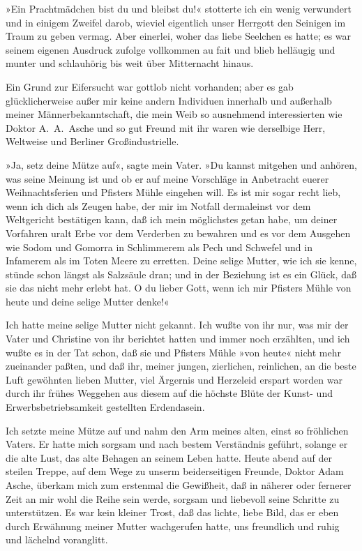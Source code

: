»Ein Prachtmädchen bist du und bleibst du!« stotterte ich ein wenig
verwundert und in einigem Zweifel darob, wieviel eigentlich unser
Herrgott den Seinigen im Traum zu geben vermag. Aber einerlei,
woher das liebe Seelchen es hatte; es war seinem eigenen Ausdruck
zufolge vollkommen au fait und blieb helläugig und munter und
schlauhörig bis weit über Mitternacht hinaus.

Ein Grund zur Eifersucht war gottlob nicht vorhanden; aber es gab
glücklicherweise außer mir keine andern Individuen innerhalb und
außerhalb meiner Männerbekanntschaft, die mein Weib so ausnehmend
interessierten wie Doktor A.~A.~Asche und so gut Freund mit ihr
waren wie derselbige Herr, Weltweise und Berliner
Großindustrielle.

»Ja, setz deine Mütze auf«, sagte mein Vater. »Du kannst mitgehen
und anhören, was seine Meinung ist und ob er auf meine Vorschläge
in Anbetracht euerer Weihnachtsferien und Pfisters Mühle eingehen
will. Es ist mir sogar recht lieb, wenn ich dich als Zeugen habe,
der mir im Notfall dermaleinst vor dem Weltgericht bestätigen kann,
daß ich mein möglichstes getan habe, um deiner Vorfahren uralt Erbe
vor dem Verderben zu bewahren und es vor dem Ausgehen wie Sodom und
Gomorra in Schlimmerem als Pech und Schwefel und in Infamerem als
im Toten Meere zu erretten. Deine selige Mutter, wie ich sie kenne,
stünde schon längst als Salzsäule dran; und in der Beziehung ist es
ein Glück, daß sie das nicht mehr erlebt hat. O du lieber Gott,
wenn ich mir Pfisters Mühle von heute und deine selige Mutter
denke!«

Ich hatte meine selige Mutter nicht gekannt. Ich wußte von ihr nur,
was mir der Vater und Christine von ihr berichtet hatten und immer
noch erzählten, und ich wußte es in der Tat schon, daß sie und
Pfisters Mühle »von heute« nicht mehr zueinander paßten, und daß
ihr, meiner jungen, zierlichen, reinlichen, an die beste Luft
gewöhnten lieben Mutter, viel Ärgernis und Herzeleid erspart worden
war durch ihr frühes Weggehen aus diesem auf die höchste Blüte der
Kunst- und Erwerbsbetriebsamkeit gestellten Erdendasein.

Ich setzte meine Mütze auf und nahm den Arm meines alten, einst so
fröhlichen Vaters. Er hatte mich sorgsam und nach bestem
Verständnis geführt, solange er die alte Lust, das alte Behagen an
seinem Leben hatte. Heute abend auf der steilen Treppe, auf dem
Wege zu unserm beiderseitigen Freunde, Doktor Adam Asche, überkam
mich zum erstenmal die Gewißheit, daß in näherer oder fernerer Zeit
an mir wohl die Reihe sein werde, sorgsam und liebevoll seine
Schritte zu unterstützen. Es war kein kleiner Trost, daß das
lichte, liebe Bild, das er eben durch Erwähnung meiner Mutter
wachgerufen hatte, uns freundlich und ruhig und lächelnd
voranglitt.

